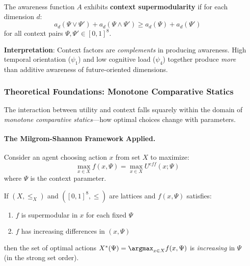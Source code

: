 \begin{definition}
\label{def:context-super}
The awareness function $A$ exhibits \textbf{context supermodularity} if for each 
dimension $d$:
\begin{equation}
a_d(\Psi \vee \Psi') + a_d(\Psi \wedge \Psi') \geq a_d(\Psi) + a_d(\Psi')
\end{equation}
for all context pairs $\Psi, \Psi' \in [0,1]^8$.
\end{definition}

\textbf{Interpretation}: Context factors are \emph{complements} in producing awareness. 
High temporal orientation ($\psi_1$) and low cognitive load ($\psi_4$) together 
produce \emph{more} than additive awareness of future-oriented dimensions.

\subsubsection{Theoretical Foundations: Monotone Comparative Statics}

The interaction between utility and context falls squarely within the domain of 
\emph{monotone comparative statics}---how optimal choices change with parameters.

\paragraph{The Milgrom-Shannon Framework Applied.}

Consider an agent choosing action $x$ from set $X$ to maximize:
\begin{equation}
\max_{x \in X} f(x, \Psi) = \max_{x \in X} U^{eff}(x; \Psi)
\end{equation}
where $\Psi$ is the context parameter.

\begin{theorem}
\label{thm:mcs-awareness}
If $(X, \leq_X)$ and $([0,1]^8, \leq)$ are lattices and $f(x, \Psi)$ satisfies:
\begin{enumerate}
    \item $f$ is supermodular in $x$ for each fixed $\Psi$
    \item $f$ has increasing differences in $(x, \Psi)$
\end{enumerate}
then the set of optimal actions $X^*(\Psi) = \argmax_{x \in X} f(x, \Psi)$ is 
\emph{increasing} in $\Psi$ (in the strong set order).
\end{theorem}

